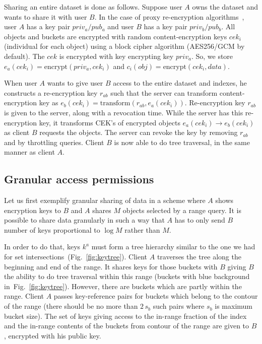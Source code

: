\documentclass[notitlepage]{revtex4-1}
\newcommand{\figref}[1]{Fig.~\ref{#1}}
\begin{document}
Sharing an entire dataset is done as follows.
Suppose user $A$ owns the dataset and wants to share it with user $B$.
In the case of proxy re-encryption algorithms~\cite{afgh,libert2011unidirectional}, user $A$ has a key pair $priv_a/pub_a$ and user $B$ has a key pair $priv_b/pub_b$.
All objects and buckets are encrypted with random content-encryption keys $cek_i$ (individual for each object) using a block cipher algorithm (AES256/GCM by default).
The $cek$ is encrypted with key encrypting key $priv_a$.
So, we store $e_a(cek_i) = \mbox{encrypt}(priv_a, cek_i)$ and $c_i(obj) = \mbox{encrypt}(cek_i, data)$.

When user $A$ wants to give user $B$ access to the entire dataset and indexes, he constructs a re-encryption key $r_{ab}$ such that
the server can transform content-encryption key as $e_b(cek_i) = \mbox{transform}(r_{ab}, e_a(cek_i))$.
Re-encryption key $r_{ab}$ is given to the server, along with a revocation time.
While the server has this re-encryption key, it transforms CEK's of encrypted objects $e_a(cek_i) \rightarrow e_b(cek_i)$ as client $B$ requests the objects.
The server can revoke the key by removing $r_{ab}$ and by throttling queries.
Client $B$ is now able to do tree traversal, in the same manner as client $A$.

\subsection{Granular access permissions}

Let us first exemplify granular sharing of data in a scheme where $A$ shows encryption keys to $B$ and $A$ shares $M$ objects selected by a range query.
It is possible to share data granularly in such a way that $A$ has to only send $B$ number of keys proportional to $\log{M}$ rather than $M$.

In order to do that, keys $k^a$ must form a tree hierarchy similar to the one we had for set intersections~(\figref{fig:keytree}).
Client $A$ traverses the tree along the beginning and end of the range.
It shares keys for those buckets with $B$ giving $B$ the ability to do tree traversal within this range (buckets with blue background in~\figref{fig:keytree}).
However, there are buckets which are partly within the range.
Client $A$ passes key-reference pairs for buckets which belong to the contour of the range (there should be no more than $2\,s_b$ such pairs where $s_b$ is maximum bucket size).
The set of keys giving access to the in-range fraction of the index and the in-range contents of the buckets from contour of the range are given to $B$, encrypted with his public key.
\end{document}
